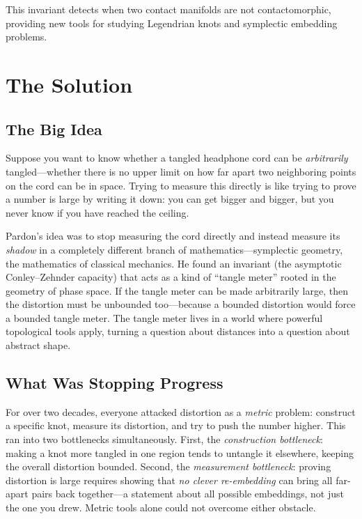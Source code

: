 This invariant detects when two contact manifolds are not contactomorphic, providing new tools for studying Legendrian knots and symplectic embedding problems.

\section{The Solution}

\subsection{The Big Idea}

Suppose you want to know whether a tangled headphone cord can be \emph{arbitrarily} tangled---whether there is no upper limit on how far apart two neighboring points on the cord can be in space. Trying to measure this directly is like trying to prove a number is large by writing it down: you can get bigger and bigger, but you never know if you have reached the ceiling.

Pardon's idea was to stop measuring the cord directly and instead measure its \emph{shadow} in a completely different branch of mathematics---symplectic geometry, the mathematics of classical mechanics. He found an invariant (the asymptotic Conley--Zehnder capacity) that acts as a kind of ``tangle meter'' rooted in the geometry of phase space. If the tangle meter can be made arbitrarily large, then the distortion must be unbounded too---because a bounded distortion would force a bounded tangle meter. The tangle meter lives in a world where powerful topological tools apply, turning a question about distances into a question about abstract shape.

\subsection{What Was Stopping Progress}

For over two decades, everyone attacked distortion as a \emph{metric} problem: construct a specific knot, measure its distortion, and try to push the number higher. This ran into two bottlenecks simultaneously. First, the \emph{construction bottleneck}: making a knot more tangled in one region tends to untangle it elsewhere, keeping the overall distortion bounded. Second, the \emph{measurement bottleneck}: proving distortion is large requires showing that \emph{no clever re-embedding} can bring all far-apart pairs back together---a statement about all possible embeddings, not just the one you drew. Metric tools alone could not overcome either obstacle.

